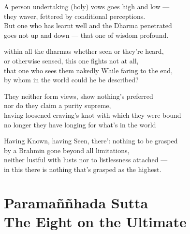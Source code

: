 \begin{MyDescription}{}
A person undertaking (holy) vows goes high and low —\\
they waver, fettered by conditional perceptions.\\
But one who has learnt well and the Dharma penetrated\\
goes not up and down — that one of wisdom profound.
\end{MyDescription}

\begin{MyDescription}{}
within all the dharmas whether seen or they're heard,\\
or otherwise sensed, this one fights not at all,\\
that one who sees them nakedly While faring to the end,\\
by whom in the world could he be described?
\end{MyDescription}

\begin{MyDescription}{}
They neither form views, show nothing's preferred\\
nor do they claim a purity supreme,\\
having loosened craving's knot with which they were bound\\
no longer they have longing for what's in the world
\end{MyDescription}

\begin{MyDescription}{}
Having Known, having Seen, there': nothing to be grasped\\
by a Brahmin gone beyond all limitations,\\
neither lustful with lusts nor to listlessness attached —\\
in this there is nothing that's grasped as the highest.
\end{MyDescription}

\begin{MyDescription}[(Sn 788-795)]{}

\end{MyDescription}

\chapter{Parama\~n\~nhada Sutta\\ The Eight on the Ultimate}

